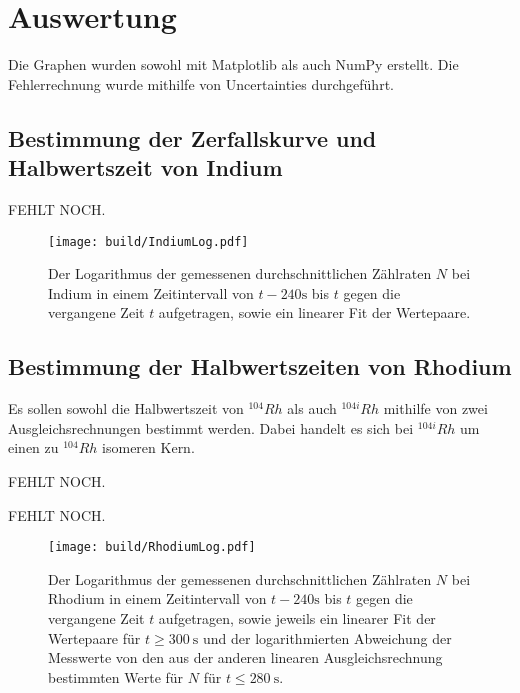 \section{Auswertung}
\label{sec:Auswertung}


Die Graphen wurden sowohl mit Matplotlib \cite{matplotlib} als auch NumPy \cite{numpy} erstellt. Die
Fehlerrechnung wurde mithilfe von Uncertainties \cite{uncertainties} durchgeführt.


\subsection{Bestimmung der Zerfallskurve und Halbwertszeit von Indium}
 \begin{table}
  \centering
  \caption{FEHLT NOCH.}
  
 \end{table}
\begin{figure}
	\centering
	\caption{Der Logarithmus der gemessenen durchschnittlichen Zählraten $N$ bei Indium in einem Zeitintervall von $t-240\si{\second}$ bis $t$ gegen die vergangene Zeit $t$ aufgetragen, sowie ein linearer Fit der Wertepaare.}
	\texttt{[image: build/IndiumLog.pdf]}
	\label{fig:Indium}
\end{figure}

\subsection{Bestimmung der Halbwertszeiten von Rhodium}
Es sollen sowohl die Halbwertszeit von $^{104} Rh$ als auch $^{104i} Rh$ mithilfe von zwei Ausgleichsrechnungen bestimmt werden. Dabei handelt es sich bei $^{104i} Rh$ um einen zu $^{104} Rh$ isomeren Kern.
 \begin{table}
	\centering
	\caption{FEHLT NOCH.}
	
\end{table}
\begin{table}
	\centering
	\caption{FEHLT NOCH.}
	
\end{table}
\begin{figure}
	\centering
	\caption{Der Logarithmus der gemessenen durchschnittlichen Zählraten $N$ bei Rhodium in einem Zeitintervall von $t-240\si{\second}$ bis $t$ gegen die vergangene Zeit $t$ aufgetragen, sowie jeweils ein linearer Fit der Wertepaare für $t\ge \SI{300}{\second}$ und der logarithmierten Abweichung der Messwerte von den aus der anderen linearen Ausgleichsrechnung bestimmten Werte für $N$ für $t\le \SI{280}{\second}$.}
	\texttt{[image: build/RhodiumLog.pdf]}
	\label{fig:Rhodium}
\end{figure}


